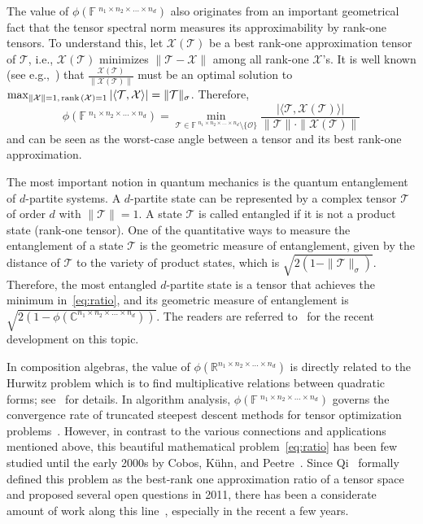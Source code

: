 \documentclass[11pt]{article}
\newcommand{\C}{\mathbb{C}}
\newcommand{\R}{\mathbb{R}}
\newcommand{\BF}{\mathbb{F}\:\!}
\newcommand{\OO}{\mathcal{O}}
\newcommand{\X}{\mathcal{X}}
\newcommand{\TT}{\mathcal{T}}
\newcommand{\rank}{\textnormal{rank}\,}
\begin{document}
The value of $\phi(\BF^{n_1\times n_2\times \dots \times n_d})$ also originates from an important geometrical fact that the tensor spectral norm measures its approximability by rank-one tensors. To understand this, let $\X(\TT)$ be a best rank-one approximation tensor of $\TT$, i.e., $\X(\TT)$ minimizes $\|\TT-\X\|$ among all rank-one $\X$'s. It is well known (see e.g.,~\cite[Proposition 1.1]{LNSU18}) that $\frac{\X(\TT)}{\|\X(\TT)\|}$ must be an optimal solution to $\max_{\|\X\|=1,\,\rank(\X)=1} |\langle \TT, \X \rangle|=\|\TT\|_\sigma$. Therefore, $$
\phi(\BF^{n_1\times n_2\times \dots \times n_d})=\min_{\TT\in\BF^{n_1\times n_2\times \dots \times n_d}\setminus\{\OO\}}\frac{|\langle \TT, \X(\TT)\rangle|}{\|\TT\|\cdot\|\X(\TT)\|}
$$
and can be seen as the worst-case angle between a tensor and its best rank-one approximation.

The most important notion in quantum mechanics is the quantum entanglement of $d$-partite systems. A $d$-partite state can be represented by a complex tensor $\TT$ of order $d$ with $\|\TT\|=1$. A state $\TT$ is called entangled if it is not a product state (rank-one tensor). One of the quantitative ways to measure the entanglement of a state $\TT$ is the geometric measure of entanglement, given by the distance of $\TT$ to the variety of product states, which is $\sqrt{2(1-\|\TT\|_\sigma)}$. Therefore, the most entangled $d$-partite state is a tensor that achieves the minimum in~\eqref{eq:ratio}, and its geometric measure of entanglement is $\sqrt{2(1-\phi(\C^{n_1\times n_2\times \dots \times n_d}))}$. The readers are referred to~\cite{BFZ22} for the recent development on this topic.

In composition algebras, the value of $\phi(\R^{n_1\times n_2\times \dots \times n_d})$ is directly related to the Hurwitz problem which is to find multiplicative relations between quadratic forms; see~\cite{LNSU18} for details. In algorithm analysis, $\phi(\BF^{n_1\times n_2\times \dots \times n_d})$ governs the convergence rate of truncated steepest descent methods for tensor optimization problems~\cite{U15}. However, in contrast to the various connections and applications mentioned above, this beautiful mathematical problem~\eqref{eq:ratio} has been few studied until the early 2000s by Cobos, K\"uhn, and Peetre~\cite{CKP99,CKP00}. Since Qi~\cite{Q11} formally defined this problem as the best-rank one approximation ratio of a tensor space and proposed several open questions in 2011, there has been a considerate amount of work along this line~\cite{KM15,DFLW17,LNSU18,LZ20,AKU20,EU21,KT22}, especially in the recent a few years.
\end{document}
